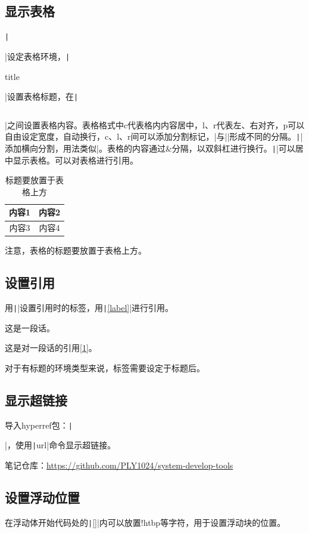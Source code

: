 \documentclass[fontset=ubuntu]{ctexart}
\begin{document}
\subsection{显示表格}
\texttt|\begin{table}[h] \end{table}|设定表格环境，\texttt|\caption{title}|设置表格标题，在\texttt|\begin{tabular}{c c c} \end{tabular}|之间设置表格内容。表格格式中c代表格内内容居中，l、r代表左、右对齐，p可以自由设定宽度，自动换行，c、l、r间可以添加分割标记，|与||形成不同的分隔。\texttt|\hline|添加横向分割，用法类似|。表格的内容通过\&分隔，以双斜杠进行换行。\texttt|\centering|可以居中显示表格。可以对表格进行引用。
\begin{table}[htb]
    \centering
    \caption{标题要放置于表格上方}
    \begin{tabular}{c||c}
        \hline\hline
        内容1 & 内容2 \\
        \hline
        内容3 & 内容4 
    \end{tabular}
    \label{tab:my_label}
\end{table}
注意，表格的标题要放置于表格上方。

\subsection{设置引用}
用\texttt|\label{label}|设置引用时的标签，用\texttt|\ref{label}|进行引用。

这是一段话\label{1}。

这是对一段话的引用\ref{1}。

对于有标题的环境类型来说，标签需要设定于标题后。

\subsection{显示超链接}
导入hyperref包：\texttt|\usepackage{hyperref}|，使用\texttt|url{}|命令显示超链接。

笔记仓库：\url{https://github.com/PLY1024/system-develop-tools}

\subsection{设置浮动位置}
在浮动体开始代码处的\texttt|[]|内可以放置!htbp等字符，用于设置浮动块的位置。
\end{document}
